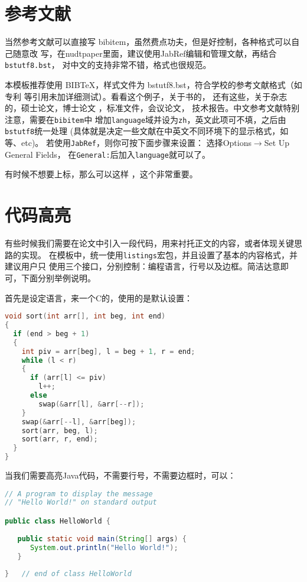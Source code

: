 \section{参考文献}
\label{sec:bib}
当然参考文献可以直接写 bibitem，虽然费点功夫，但是好控制，各种格式可以自己随意改
写，在nudtpaper里面，建议使用JabRef编辑和管理文献，再结合\verb|bstutf8.bst|，
对中文的支持非常不错，格式也很规范。

本模板推荐使用 BIB\TeX，样式文件为 bstutf8.bst，符合学校的参考文献格式（如专利
等引用未加详细测试）。看看这个例子，关于书的，
还有这些，关于杂志的，硕士论文，博士论文
，标准文件，会议论文，%
技术报告。中文参考文献\textsf{特别注意}，需要在\verb|bibitem|中
增加\verb|language|域并设为\verb|zh|，英文此项可不填，之后由\verb|bstutf8|统一处理
(具体就是决定一些文献在中英文不同环境下的显示格式，如等、etc)。
若使用\verb|JabRef|，则你可按下面步骤来设置：
选择\textsf{Options}$\rightarrow$\textsf{Set Up General Fields}，
在\verb|General:|后加入\verb|language|就可以了。

有时候不想要上标，那么可以这样 \cite{shaheshang}，这个非常重要。

\section{代码高亮}
有些时候我们需要在论文中引入一段代码，用来衬托正文的内容，或者体现关键思路的实现。
在模板中，统一使用\texttt{listings}宏包，并且设置了基本的内容格式，并建议用户只
使用三个接口，分别控制：编程语言，行号以及边框。简洁达意即可，下面分别举例说明。

首先是设定语言，来一个C的，使用的是默认设置：
\begin{lstlisting}[language=C]
void sort(int arr[], int beg, int end)
{
  if (end > beg + 1)
  {
    int piv = arr[beg], l = beg + 1, r = end;
    while (l < r)
    {
      if (arr[l] <= piv)
        l++;
      else
        swap(&arr[l], &arr[--r]);
    }
    swap(&arr[--l], &arr[beg]);
    sort(arr, beg, l);
    sort(arr, r, end);
  }
}
\end{lstlisting}

当我们需要高亮Java代码，不需要行号，不需要边框时，可以：
\begin{lstlisting}[language=Java,numbers=none,frame=none]
// A program to display the message
// "Hello World!" on standard output

public class HelloWorld {
 
   public static void main(String[] args) {
      System.out.println("Hello World!");
   }
      
}   // end of class HelloWorld
\end{lstlisting}

